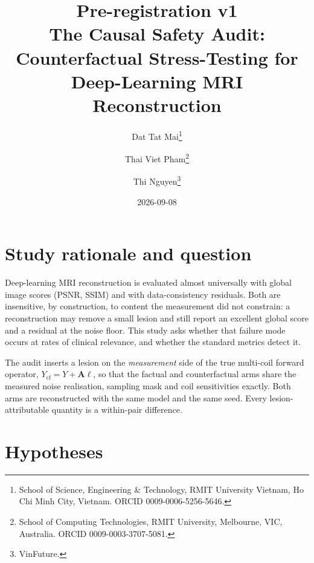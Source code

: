 \documentclass[11pt,a4paper]{article}
\title{\textbf{Pre-registration v1}\\[0.3em]
The Causal Safety Audit: Counterfactual Stress-Testing for\\
Deep-Learning MRI Reconstruction}
\author{Dat Tat Mai\thanks{School of Science, Engineering \& Technology, RMIT
University Vietnam, Ho Chi Minh City, Vietnam. ORCID
0009-0006-5256-5646.}
\and Thai Viet Pham\thanks{School of Computing Technologies, RMIT University,
Melbourne, VIC, Australia. ORCID 0009-0003-3707-5081.}
\and Thi Nguyen\thanks{VinFuture.}}
\date{2026-09-08}
\begin{document}
\maketitle

\begin{center}
\end{center}

\section{Study rationale and question}

Deep-learning MRI reconstruction is evaluated almost universally with global
image scores (PSNR, SSIM) and with data-consistency residuals. Both are
insensitive, by construction, to content the measurement did not constrain: a
reconstruction may remove a small lesion and still report an excellent global
score and a residual at the noise floor. This study asks whether that failure
mode occurs at rates of clinical relevance, and whether the standard metrics
detect it.

The audit inserts a lesion on the \emph{measurement} side of the true
multi-coil forward operator, $Y_{\mathrm{cf}} = Y + \mathbf{A}\ell$, so that
the factual and counterfactual arms share the measured noise realisation,
sampling mask and coil sensitivities exactly. Both arms are reconstructed with
the same model and the same seed. Every lesion-attributable quantity is a
within-pair difference.

\section{Hypotheses}
\end{document}
